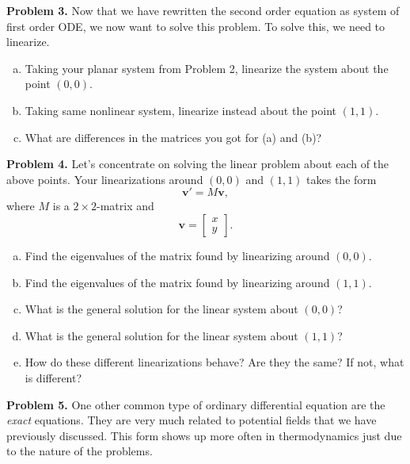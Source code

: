 \documentclass[12pt]{report} %
\theoremstyle{definition}
\begin{document}
\noindent\textbf{Problem 3.} Now that we have rewritten the second order equation as system of first order ODE, we now want to solve this problem.  To solve this, we need to linearize.
\begin{enumerate}[(a)]
    \item Taking your planar system from Problem 2, linearize the system about the point $(0,0)$. 
    \item Taking same nonlinear system, linearize instead about the point $(1,1)$.  
    \item What are differences in the matrices you got for (a) and (b)? 
\end{enumerate}
\vspace*{.5cm}

\noindent\textbf{Problem 4.} Let's concentrate on solving the linear problem about each of the above points. Your linearizations around $(0,0)$ and $(1,1)$ takes the form
    \[
    \mathbf{v}'=M\mathbf{v},
    \]
    where $M$ is a $2\times2$-matrix and 
    \[
    \mathbf{v}= \begin{bmatrix} x \\ y \end{bmatrix}.
    \]
\begin{enumerate}[(a)]
    \item Find the eigenvalues of the matrix found by linearizing around $(0,0)$.
    \item Find the eigenvalues of the matrix found by linearizing around $(1,1)$.
    \item What is the general solution for the linear system about $(0,0)$?
    \item What is the general solution for the linear system about $(1,1)$?
    \item How do these different linearizations behave? Are they the same? If not, what is different?
\end{enumerate}
\vspace*{.5cm}

\noindent\textbf{Problem 5.} One other common type of ordinary differential equation are the \emph{exact} equations.  They are very much related to potential fields that we have previously discussed. This form shows up more often in thermodynamics just due to the nature of the problems.
\end{document}
